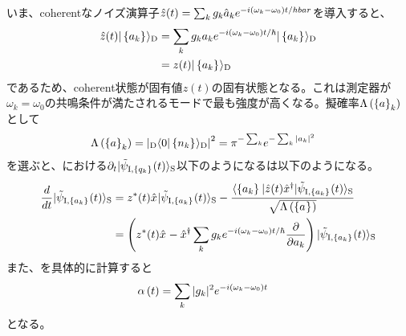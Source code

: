 \documentclass[10pt, a4paper]{jsarticle}
\begin{document}
いま、coherentなノイズ演算子$\hat{z}_{}(t) = \sum_{k} g_{k} \hat{a}_{k} e^{-i \left( \omega_{k} - \omega_{0} \right) t / hbar}$を導入すると、
\begin{equation}
\begin{split}
\label{eq:221}
	\op{z}{}(t) \ket{\set{a_{k}}{}}{D} &= \sum_{k} g_{k} a_{k} \e{-i \left( \omega_{k} - \omega_{0} \right) t / \hbar} \ket{\set{a_{k}}{}}{D} \\
		&= z(t) \ket{\set{a_{k}}{}}{D}
\end{split}
\end{equation}
であるため、coherent状態が固有値$z(t)$の固有状態となる。これは測定器が$\omega_{k} = \omega_{0}$の共鳴条件が満たされるモードで最も強度が高くなる。擬確率$\Lambda \left( \left\{ a \right\}_{k} \right)$として
\begin{equation}
\begin{split}
\label{eq:222}
	\Lambda \left( \set{a}{k} \right) &= \norm{\inner{0}{D}{\set{n_{k}}{}}{D}}^{2} = \pi^{- \sum_{k}} \e{- \sum_{k} \abs{a_{k}}^{2}}
\end{split}
\end{equation}
を選ぶと、における$\partial_{t} | \tilde{\psi}_{{\rm I}, \left\{ q_{k} \right\}_{}}(t) \rangle_{\rm S}$以下のようになるは以下のようになる。
\begin{equation}
\begin{split}
\label{eq:223}
	\dev{}{t}\ket{\tilde{\psi}_{{\rm I}, \set{a_{k}}{}}(t)}{S} &= z^{*}(t) \op{x}{} \ket{\tilde{\psi}_{{\rm I}, \set{a_{k}}{}}(t)}{S} - \dfrac{\bra{\set{a_{k}}{}}{} \op{z}{}(t) \dop{x}{} \ket{\tilde{\psi}_{{\rm I}, \set{a_{k}}{}}(t)}{S}}{\sqrt{\Lambda \left( \set{a_{}}{} \right)}} \\
		&= \left( z^{*}(t) \op{x}{} - \dop{x}{} \sum_{k} g_{k} \e{-i \left( \omega_{k} - \omega_{0} \right) t / \hbar} \pdev{}{a_{k}} \right) \ket{\tilde{\psi}_{{\rm I}, \set{a_{k}}{}}(t)}{S}
\end{split}
\end{equation}
また、を具体的に計算すると
\begin{equation}
\begin{split}
\label{eq:224}
	\alpha \left( t \right) &= \sum_{k} \abs{g_{k}}^{2} \e{-i \left( \omega_{k} - \omega_{0} \right) t}
\end{split}
\end{equation}
となる。
\end{document}
